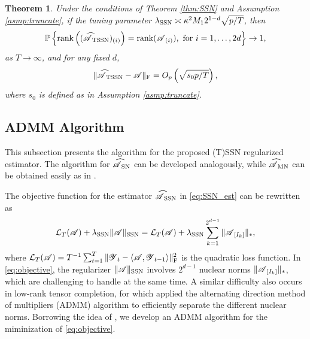 \documentclass[12pt]{article}
\newtheorem{theorem}{Theorem}
\newcommand{\cm}[1]{\mbox{\boldmath$\mathscr{#1}$}}
\begin{document}
\begin{theorem} \label{thm:rankconsistency}
	Under the conditions of Theorem \ref{thm:SSN} and Assumption \ref{asmp:truncate}, if the tuning parameter $\lambda_{\textup{SSN}}\asymp\kappa^2M_12^{1-d}\sqrt{p/T}$, then
	\begin{equation*}
	\mathbb{P}\left\{\textup{rank}\left((\cm{\widehat{A}}_{\textup{TSSN}})_{(i)}\right)=\textup{rank}(\cm{A}_{(i)}),~\text{for}~i=1,\dots,2d\right\}\to 1,
	\end{equation*}
	as  $T\to\infty$, and for any fixed $d$,
	\[
	\|\cm{\widehat{A}}_{\textup{TSSN}}-\cm{A}\|_{\textup{F}}=O_p\left (\sqrt{s_0p/T}\right ), 
	\]
	where $s_0$ is defined as in Assumption \ref{asmp:truncate}.
\end{theorem}

%

\subsection{ADMM Algorithm}\label{subsec:ADMM}
This subsection  presents the algorithm for the proposed (T)SSN regularized estimator. The algorithm for $\cm{\widehat{A}}_{\textup{SN}}$ can be developed analogously, while $\cm{\widehat{A}}_{\textup{MN}}$ can be obtained easily as in \cite{negahban2011estimation}.

The objective function for the estimator $\cm{\widehat{A}}_{\textup{SSN}}$ in \eqref{eq:SSN_est} can be rewritten as
\begin{equation}\label{eq:objective}
\mathcal{L}_T(\cm{A})+\lambda_{\text{SSN}}\|\cm{A}\|_{\text{SSN}}=\mathcal{L}_T(\cm{A})+\lambda_{\text{SSN}}\sum_{k=1}^{2^{d-1}}\|\cm{A}_{[I_k]}\|_*,
\end{equation}
where $\mathcal{L}_T(\cm{A})=T^{-1}\sum_{t=1}^{T}\|\cm{Y}_t-\langle\cm{A},\cm{Y}_{t-1}\rangle\|_\text{F}^2$ is the quadratic loss function. In \eqref{eq:objective}, the regularizer $\|\cm{A}\|_{\text{SSN}}$ involves $2^{d-1}$ nuclear norms $\|\cm{A}_{[I_k]}\|_*$, which are challenging to handle at the same time. A similar difficulty also occurs in low-rank tensor completion, for which \citet{gandy2011tensor}  applied the alternating direction method of multipliers (ADMM) algorithm \citep{boyd2011distributed} to efficiently separate the different nuclear norms. Borrowing the idea of \citet{gandy2011tensor}, we develop an ADMM algorithm for the miminization of \eqref{eq:objective}.
 
\end{document}
